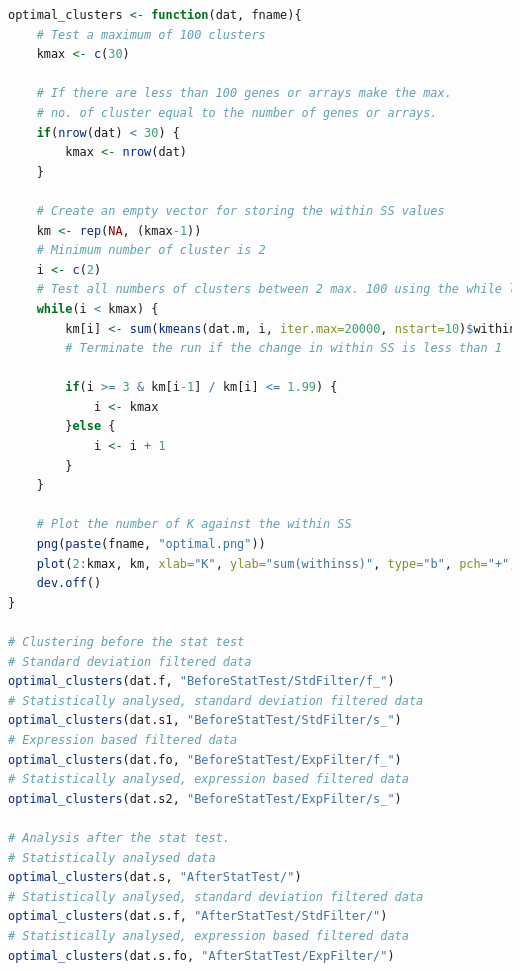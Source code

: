 \documentclass[oneside, a4paper, 11pt]{book}
\begin{document}
\begin{lstlisting}[language=R, caption=Optimal clusters]
optimal_clusters <- function(dat, fname){
    # Test a maximum of 100 clusters
    kmax <- c(30)
    
    # If there are less than 100 genes or arrays make the max.
    # no. of cluster equal to the number of genes or arrays.
    if(nrow(dat) < 30) {
        kmax <- nrow(dat)
    }
    
    # Create an empty vector for storing the within SS values
    km <- rep(NA, (kmax-1))
    # Minimum number of cluster is 2
    i <- c(2)
    # Test all numbers of clusters between 2 max. 100 using the while loop
    while(i < kmax) {
        km[i] <- sum(kmeans(dat.m, i, iter.max=20000, nstart=10)$withinss)
        # Terminate the run if the change in within SS is less than 1
    
        if(i >= 3 & km[i-1] / km[i] <= 1.99) {
            i <- kmax
        }else {
            i <- i + 1
        }
    }

    # Plot the number of K against the within SS
    png(paste(fname, "optimal.png"))
    plot(2:kmax, km, xlab="K", ylab="sum(withinss)", type="b", pch="+", main="Terminated when change less than 2%")
    dev.off()
}

# Clustering before the stat test
# Standard deviation filtered data
optimal_clusters(dat.f, "BeforeStatTest/StdFilter/f_")
# Statistically analysed, standard deviation filtered data
optimal_clusters(dat.s1, "BeforeStatTest/StdFilter/s_")
# Expression based filtered data
optimal_clusters(dat.fo, "BeforeStatTest/ExpFilter/f_")
# Statistically analysed, expression based filtered data
optimal_clusters(dat.s2, "BeforeStatTest/ExpFilter/s_")

# Analysis after the stat test.
# Statistically analysed data
optimal_clusters(dat.s, "AfterStatTest/")
# Statistically analysed, standard deviation filtered data
optimal_clusters(dat.s.f, "AfterStatTest/StdFilter/")
# Statistically analysed, expression based filtered data
optimal_clusters(dat.s.fo, "AfterStatTest/ExpFilter/")
\end{lstlisting}
\end{document}
